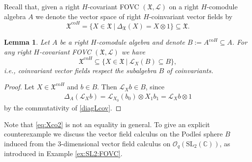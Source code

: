 \documentclass{article}
\newtheorem{lemma}[thm]{Lemma}
\theoremstyle{definition}
\begin{document}
Recall that, given a right $H$-covariant FOVC $(\mathfrak{X},\mathscr{L})$ on a right $H$-comodule algebra $A$ we denote the vector space of right $H$-coinvariant vector fields by
\begin{equation}\label{eq:coinvX}
	\mathfrak{X}^{\mathrm{co}H}=\{X\in\mathfrak{X}~|~\Delta_{\mathfrak{X}}(X)=X\otimes 1\}\subseteq\mathfrak{X}.
\end{equation}
\begin{lemma}\label{lem:XcoH}
	Let $A$ be a right $H$-comodule algebra and denote $B:=A^{\mathrm{co}H}\subseteq A$.
	For any right $H$-covariant FOVC $(\mathfrak{X},\mathscr{L})$ we have
	\begin{equation}\label{eq:Xco2}
		\mathfrak{X}^{\mathrm{co}H}\subseteq\{X\in\mathfrak{X}~|~\mathscr{L}_X(B)\subseteq B\},
	\end{equation}
	i.e., coinvariant vector fields respect the subalgebra $B$ of coinvariants.
\end{lemma}
\begin{proof}
	Let $X\in\mathfrak{X}^{\mathrm{co}H}$ and $b\in B$. Then $\mathscr{L}_Xb\in B$, since
	\begin{align*}
		\Delta_A(\mathscr{L}_Xb)
		=\mathscr{L}_{X_0}(b_0)\otimes X_1b_1
		=\mathscr{L}_Xb\otimes 1
	\end{align*}
	by the commutativity of \eqref{diagLcov}.
\end{proof}

Note that \eqref{eq:Xco2} is not an equality in general. To give an explicit counterexample we discuss the vector field calculus on the Podle\'s sphere $B$ induced from the $3$-dimensional vector field calculus on $\mathcal{O}_q(\mathrm{SL}_2(\mathbb{C}))$, as introduced in Example \ref{ex:SL2:FOVC}.
\end{document}
